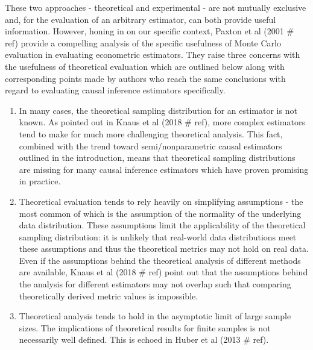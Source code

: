 \documentclass[../main.tex]{subfiles}
\begin{document}
\vspace{\baselineskip}
These two approaches - theoretical and experimental - are not mutually exclusive and, for the evaluation of an arbitrary estimator, can both provide useful information. However, honing in on our specific context, Paxton et al (2001 $\#$ ref) provide a compelling analysis of the specific usefulness of Monte Carlo evaluation in evaluating econometric estimators. They raise three concerns with the usefulness of theoretical evaluation which are outlined below along with corresponding points made by authors who reach the same conclusions with regard to evaluating causal inference estimators specifically.\par


\vspace{\baselineskip}
\begin{enumerate}
	\item In many cases, the theoretical sampling distribution for an estimator is not known. As pointed out in Knaus et al (2018 $\#$ ref), more complex estimators tend to make for much more challenging theoretical analysis. This fact, combined with the trend toward semi/nonparametric causal estimators outlined in the introduction, means that theoretical sampling distributions are missing for many causal inference estimators which have proven promising in practice.\par


\vspace{\baselineskip}
	\item Theoretical evaluation tends to rely heavily on simplifying assumptions - the most common of which is the assumption of the normality of the underlying data distribution. These assumptions limit the applicability of the theoretical sampling distribution: it is unlikely that real-world data distributions meet these assumptions and thus the theoretical metrics may not hold on real data. Even if the assumptions behind the theoretical analysis of different methods are available, Knaus et al (2018 $\#$ ref) point out that the assumptions behind the analysis for different estimators may not overlap such that comparing theoretically derived metric values is impossible.\par


\vspace{\baselineskip}
	\item Theoretical analysis tends to hold in the asymptotic limit of large sample sizes. The implications of theoretical results for finite samples is not necessarily well defined. This is echoed in Huber et al (2013 $\#$ ref).
\end{enumerate}\par
\end{document}
